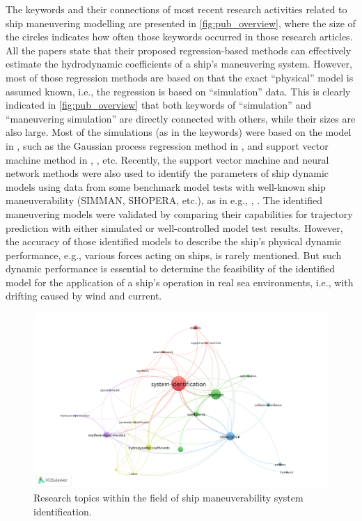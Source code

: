 The keywords and their connections of most recent research activities related to ship maneuvering modelling are presented in \autoref{fig:pub_overview}, where the size of the circles indicates how often those keywords occurred in those research articles. All the papers state that their proposed regression-based methods can effectively estimate the hydrodynamic coefficients of a ship’s maneuvering system. However, most of those regression methods are based on that the exact “physical” model is assumed known, i.e., the regression is based on “simulation” data. This is clearly indicated in \autoref{fig:pub_overview} that both keywords of “simulation” and “maneuvering simulation” are directly connected with others, while their sizes are also large.
Most of the simulations (as in the keywords) were based on the model in \citet{fossen_handbook_2021}, such as the Gaussian process regression method in \citet{xue_system_2020}, and support vector machine method in \citet{wang_identification_2019}, \citet{wang_parameter_2021}, etc. Recently, the support vector machine and neural network methods were also used to identify the parameters of ship dynamic models using data from some benchmark model tests with well-known ship maneuverability (SIMMAN, SHOPERA, etc.), as in e.g., \citet{wang_kernel-based_2020}, \citet{wakita_neural_2021}. The identified maneuvering models were validated by comparing their capabilities for trajectory prediction with either simulated or well-controlled model test results. However, the accuracy of those identified models to describe the ship’s physical dynamic performance, e.g., various forces acting on ships, is rarely mentioned. But such dynamic performance is essential to determine the feasibility of the identified model for the application of a ship’s operation in real sea environments, i.e., with drifting caused by wind and current.
\begin{figure}[h]
  \includegraphics[width=\textwidth]{figures/keywords.png}
  \caption{Research topics within the field of ship maneuverability system identification.}
  \label{fig:pub_overview}
\end{figure}
